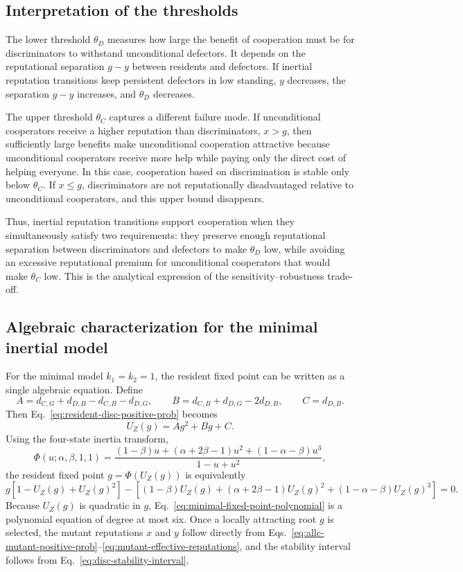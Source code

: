 \documentclass[fleqn,10pt]{wlscirep}
\begin{document}
\subsection*{Interpretation of the thresholds}

The lower threshold $\theta_D$ measures how large the benefit of cooperation must be for discriminators to withstand unconditional defectors. It depends on the reputational separation $g-y$ between residents and defectors. If inertial reputation transitions keep persistent defectors in low standing, $y$ decreases, the separation $g-y$ increases, and $\theta_D$ decreases.

The upper threshold $\theta_C$ captures a different failure mode. If unconditional cooperators receive a higher reputation than discriminators, $x>g$, then sufficiently large benefits make unconditional cooperation attractive because unconditional cooperators receive more help while paying only the direct cost of helping everyone. In this case, cooperation based on discrimination is stable only below $\theta_C$. If $x\le g$, discriminators are not reputationally disadvantaged relative to unconditional cooperators, and this upper bound disappears.

Thus, inertial reputation transitions support cooperation when they simultaneously satisfy two requirements: they preserve enough reputational separation between discriminators and defectors to make $\theta_D$ low, while avoiding an excessive reputational premium for unconditional cooperators that would make $\theta_C$ low. This is the analytical expression of the sensitivity--robustness trade-off.

\subsection*{Algebraic characterization for the minimal inertial model}

For the minimal model $k_1=k_2=1$, the resident fixed point can be written as a single algebraic equation. Define
\[
A=d_{C,G}+d_{D,B}-d_{C,B}-d_{D,G},\qquad
B=d_{C,B}+d_{D,G}-2d_{D,B},\qquad
C=d_{D,B}.
\]
Then Eq.~\eqref{eq:resident-disc-positive-prob} becomes
\[
U_Z(g)=Ag^2+Bg+C.
\]
Using the four-state inertia transform,
\[
\Phi(u;\alpha,\beta,1,1)=
\frac{(1-\beta)u+(\alpha+2\beta-1)u^2+(1-\alpha-\beta)u^3}{1-u+u^2},
\]
the resident fixed point $g=\Phi(U_Z(g))$ is equivalently
\begin{equation}
\label{eq:minimal-fixed-point-polynomial}
g\left[1-U_Z(g)+U_Z(g)^2\right]
-
\left[(1-\beta)U_Z(g)+(\alpha+2\beta-1)U_Z(g)^2+(1-\alpha-\beta)U_Z(g)^3\right]=0.
\end{equation}
Because $U_Z(g)$ is quadratic in $g$, Eq.~\eqref{eq:minimal-fixed-point-polynomial} is a polynomial equation of degree at most six. Once a locally attracting root $g$ is selected, the mutant reputations $x$ and $y$ follow directly from Eqs.~\eqref{eq:allc-mutant-positive-prob}--\eqref{eq:mutant-effective-reputations}, and the stability interval follows from Eq.~\eqref{eq:disc-stability-interval}.
\end{document}
